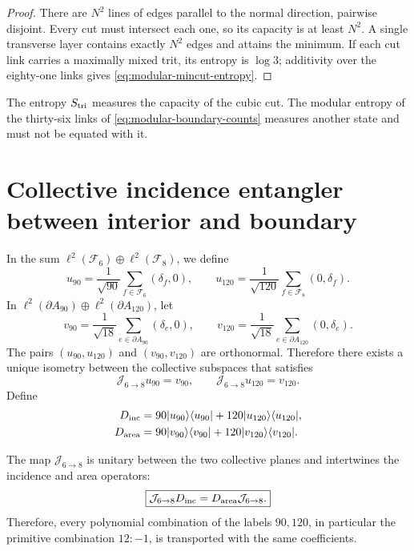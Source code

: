 \begin{proof}
There are \(N^2\) lines of edges parallel to the normal direction, pairwise
disjoint. Every cut must intersect each one, so its capacity
is at least \(N^2\). A single transverse layer contains exactly
\(N^2\) edges and attains the minimum. If each cut link carries a
maximally mixed trit, its entropy is \(\log3\); additivity over the
eighty-one links gives \cref{eq:modular-mincut-entropy}.
\end{proof}

The entropy \(S_{\rm tri}\) measures the capacity of the cubic cut. The
modular entropy of the thirty-six links of
\cref{eq:modular-boundary-counts} measures another state and must not be equated with
it.

\section{Collective incidence entangler between interior and boundary}

In the sum
\(\ell^2(\mathcal F_6)\oplus\ell^2(\mathcal F_8)\), we define
\begin{equation}
\label{eq:modular-u90-u120}
u_{90}=\frac1{\sqrt{90}}\sum_{f\in\mathcal F_6}(\delta_f,0),
\qquad
u_{120}=\frac1{\sqrt{120}}\sum_{f\in\mathcal F_8}(0,\delta_f).
\end{equation}
In
\(\ell^2(\partial A_{90})\oplus\ell^2(\partial A_{120})\), let
\begin{equation}
\label{eq:modular-v90-v120}
v_{90}=\frac1{\sqrt{18}}\sum_{e\in\partial A_{90}}(\delta_e,0),
\qquad
v_{120}=\frac1{\sqrt{18}}\sum_{e\in\partial A_{120}}(0,\delta_e).
\end{equation}
The pairs \((u_{90},u_{120})\) and \((v_{90},v_{120})\) are orthonormal.
Therefore there exists a unique isometry between the collective subspaces
that satisfies
\begin{equation}
\label{eq:modular-J68}
\mathcal J_{6\to8}u_{90}=v_{90},
\qquad
\mathcal J_{6\to8}u_{120}=v_{120}.
\end{equation}
Define
\begin{align}
D_{\rm inc}
&=90|u_{90}\rangle\langle u_{90}|
+120|u_{120}\rangle\langle u_{120}|,
\label{eq:modular-Dinc}\\
D_{\rm area}
&=90|v_{90}\rangle\langle v_{90}|
+120|v_{120}\rangle\langle v_{120}|.
\label{eq:modular-Darea}
\end{align}

\begin{theorem}
\label{thm:modular-J68}
The map \(\mathcal J_{6\to8}\) is unitary between the two collective
planes and intertwines the incidence and area operators:
\begin{equation}
\label{eq:modular-J-intertwining}
\boxed{
\mathcal J_{6\to8}D_{\rm inc}
=D_{\rm area}\mathcal J_{6\to8}.}
\end{equation}
Therefore, every polynomial combination of the labels \(90,120\), in
particular the primitive combination \(12:-1\), is transported with the
same coefficients.
\end{theorem}

